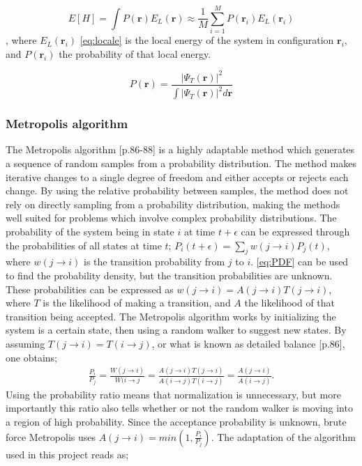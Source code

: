 \documentclass[%
oneside,                 %
final,                   %
10pt]{article}
\begin{document}
\begin{equation}
E[H]=\int P(\bm r) E_L(\bm r) \approx \frac{1}{M}\sum_{i=1}^M P(\bm r_i) E_L(\bm r_i)
\end{equation}
, where $E_L(\bm r_i)$ \eqref{eq:locale} is the local energy of the system in configuration $\bm r_i$, and $P(\bm r_i)$ the probability of that local energy.

\begin{equation}
P(\bm r)=\frac{|\Psi_T (\bm r) |^2}{\int |\Psi_T (\bm r)|^2 d\bm r }
\label{eq:PDF}
\end{equation}


\subsubsection{Metropolis algorithm}
The Metropolis algorithm \citep{CMP}[p.86-88] is a highly adaptable method which generates a sequence of random samples from a probability distribution. The method makes iterative changes to a single degree of freedom and either accepts or rejects each change. By using the relative probability between samples, the method does not rely on directly sampling from a probability distribution, making the methods well suited for problems which involve complex probability distributions. 
The probability of the system being in state $i$ at time $t+\epsilon$ can be expressed through the probabilities of all states at time $t$; $P_i(t+\epsilon)=\sum_j w(j\rightarrow i)P_j(t)$, where $w(j\rightarrow i)$ is the transition probability from $j$ to $i$.  \eqref{eq:PDF} can be used to find the probability density, but the transition probabilities are unknown. These probabilities can be expressed as $w(j\rightarrow i)=A(j\rightarrow i) T(j\rightarrow i)$, where $T$ is the likelihood of making a transition, and $A$ the likelihood of that transition being accepted. The Metropolis algorithm works by initializing the system is a certain state, then using a random walker to suggest new states. By assuming $T(j\rightarrow i)=T(i\rightarrow j)$, or what is known as detailed balance \citep{CMP}[p.86], one obtains; \begin{align*}
\frac{P_i}{P_j}= \frac{W(j\rightarrow i)}{W(i\rightarrow j}= \frac{A(j\rightarrow i)T(j\rightarrow i)}{A(i\rightarrow j)T(i\rightarrow j)}=\frac{A(j\rightarrow i)}{A(i\rightarrow j)}.
\end{align*}
Using the probability ratio means that normalization is unnecessary, but more importantly this ratio also tells whether or not the random walker is moving into a region of high probability. Since the acceptance probability is unknown, brute force Metropolis uses $A(j\rightarrow i)=min(1,\frac{P_i}{P_j})$. The adaptation of the algorithm used in this project reads as; 
\end{document}
